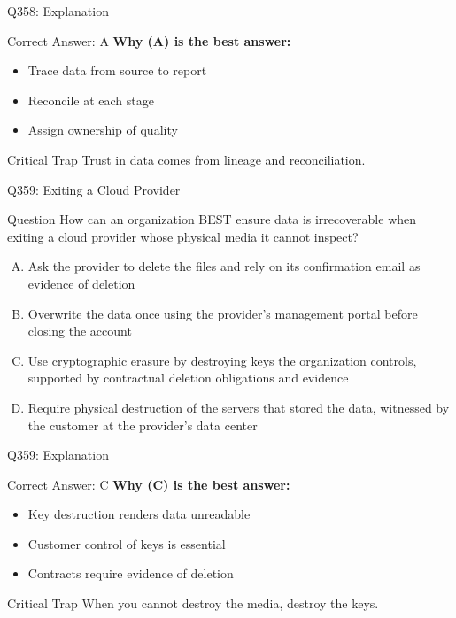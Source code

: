 \documentclass{beamer}
\begin{document}
	\begin{frame}{Q358: Explanation}
		\begin{block}{Correct Answer: A}
			\textbf{Why (A) is the best answer:}
			\begin{itemize}
				\item Trace data from source to report
				\item Reconcile at each stage
				\item Assign ownership of quality
			\end{itemize}
		\end{block}
		\begin{alertblock}{Critical Trap}
			Trust in data comes from lineage and reconciliation.
		\end{alertblock}
	\end{frame}
	
	\begin{frame}{Q359: Exiting a Cloud Provider}
		\begin{block}{Question}
			\small How can an organization BEST ensure data is irrecoverable when exiting a cloud provider whose physical media it cannot inspect?
		\end{block}
		\begin{enumerate}[(A)]
			\footnotesize
			\item Ask the provider to delete the files and rely on its confirmation email as evidence of deletion
			\item Overwrite the data once using the provider's management portal before closing the account
			\item Use cryptographic erasure by destroying keys the organization controls, supported by contractual deletion obligations and evidence
			\item Require physical destruction of the servers that stored the data, witnessed by the customer at the provider's data center
		\end{enumerate}
	\end{frame}
	
	\begin{frame}{Q359: Explanation}
		\begin{block}{Correct Answer: C}
			\textbf{Why (C) is the best answer:}
			\begin{itemize}
				\item Key destruction renders data unreadable
				\item Customer control of keys is essential
				\item Contracts require evidence of deletion
			\end{itemize}
		\end{block}
		\begin{alertblock}{Critical Trap}
			When you cannot destroy the media, destroy the keys.
		\end{alertblock}
	\end{frame}
	
\end{document}
